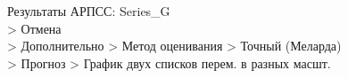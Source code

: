 Результаты АРПСС: Series\_G\\
> Отмена\\
> Дополнительно > Метод оценивания > Точный (Меларда)\\
> Прогноз > График двух списков перем. в разных масшт.





